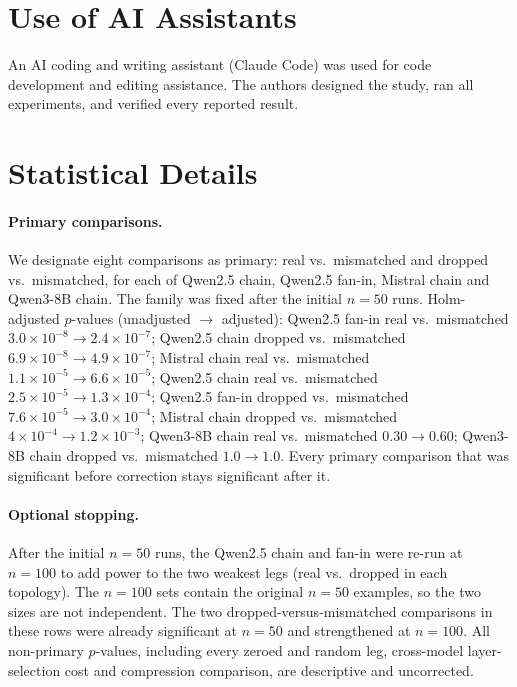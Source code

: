 \documentclass[11pt]{article}
\begin{document}
\section*{Use of AI Assistants}

An AI coding and writing assistant (Claude Code) was used for code
development and editing assistance. The authors designed the study, ran
all experiments, and verified every reported result.





\appendix

\section{Statistical Details}
\label{app:stats}

\paragraph{Primary comparisons.} We designate eight comparisons as primary:
real vs.\ mismatched and dropped vs.\ mismatched, for each of Qwen2.5 chain,
Qwen2.5 fan-in, Mistral chain and Qwen3-8B chain. The family was fixed after
the initial $n{=}50$ runs. Holm-adjusted $p$-values (unadjusted $\to$
adjusted): Qwen2.5 fan-in real vs.\ mismatched $3.0\times10^{-8}\to
2.4\times10^{-7}$; Qwen2.5 chain dropped vs.\ mismatched $6.9\times10^{-8}\to
4.9\times10^{-7}$; Mistral chain real vs.\ mismatched $1.1\times10^{-5}\to
6.6\times10^{-5}$; Qwen2.5 chain real vs.\ mismatched $2.5\times10^{-5}\to
1.3\times10^{-4}$; Qwen2.5 fan-in dropped vs.\ mismatched $7.6\times10^{-5}\to
3.0\times10^{-4}$; Mistral chain dropped vs.\ mismatched $4\times10^{-4}\to
1.2\times10^{-3}$; Qwen3-8B chain real vs.\ mismatched $0.30\to0.60$; Qwen3-8B
chain dropped vs.\ mismatched $1.0\to1.0$. Every primary comparison that was
significant before correction stays significant after it.

\paragraph{Optional stopping.} After the initial $n{=}50$ runs, the Qwen2.5
chain and fan-in were re-run at $n{=}100$ to add power to the two weakest legs
(real vs.\ dropped in each topology). The $n{=}100$ sets contain the original
$n{=}50$ examples, so the two sizes are not independent. The two
dropped-versus-mismatched comparisons in these rows were already significant
at $n{=}50$ and strengthened at $n{=}100$. All non-primary $p$-values,
including every zeroed and random leg, cross-model layer-selection cost and
compression comparison, are descriptive and uncorrected.
\end{document}
